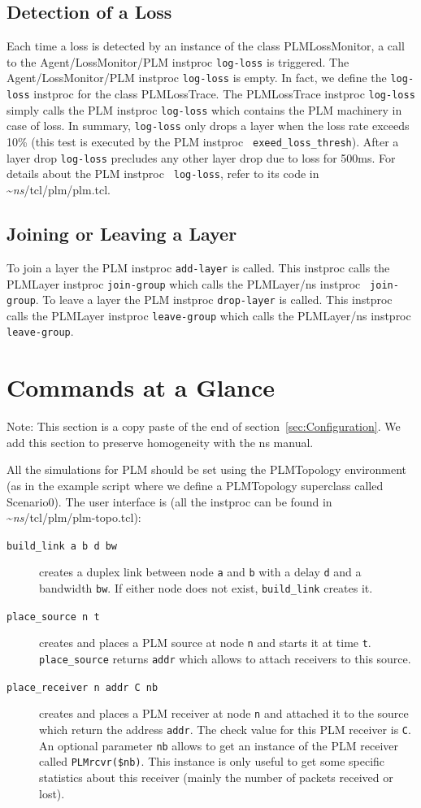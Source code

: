 {\subsection{Detection of a Loss}
Each time a loss is detected by an instance of the class PLMLossMonitor, a call to
the Agent/LossMonitor/PLM instproc {\tt log-loss} is triggered. The
Agent/LossMonitor/PLM instproc {\tt log-loss} 
is empty. In fact, we define the {\tt log-loss} instproc for the class
PLMLossTrace. The PLMLossTrace instproc {\tt log-loss} simply
calls the PLM instproc {\tt log-loss} which contains the PLM machinery in case
of loss. In summary, {\tt log-loss} only drops a layer when the loss rate
exceeds 10\% (this test is executed by the PLM instproc {\tt
  exeed\_loss\_thresh}). After a layer drop {\tt log-loss} precludes any
other layer drop due to loss for 500ms. For details about the PLM instproc {\tt
  log-loss}, refer to its code in \textasciitilde\emph{ns}/{tcl/plm/plm.tcl}. 

\subsection{Joining or Leaving a Layer}
To join a layer the PLM instproc {\tt add-layer} is called. This instproc
calls the PLMLayer instproc {\tt join-group} which calls the PLMLayer/ns instproc {\tt
  join-group}.
To leave a layer the PLM instproc {\tt drop-layer} is called. This instproc
calls the PLMLayer instproc {\tt leave-group} which calls the PLMLayer/ns instproc {\tt
  leave-group}.

\section{Commands at a Glance}
Note: This section is a copy paste of the end of
section~\ref{sec:Configuration}. We add this section to preserve homogeneity with
the ns manual.

All the simulations for PLM should be set using the PLMTopology environment (as
in the example script where we define a PLMTopology superclass called Scenario0). The
user interface is (all the instproc can be found in \textasciitilde\emph{ns}/{tcl/plm/plm-topo.tcl}):
\begin{description}
\item[\tt build\_link a b d bw] creates a duplex link between node
  {\tt a} and {\tt b} with a delay {\tt d} and a bandwidth {\tt bw}. If
  either node does not exist, {\tt build\_link} creates it.
\item[\tt place\_source n t] creates and places a PLM source at node {\tt n} and
  starts it at time {\tt t}. {\tt place\_source} returns {\tt addr} which
  allows to attach receivers to this source.
\item[\tt place\_receiver n addr C nb] creates and places a PLM receiver at node
  {\tt n} and attached it to the source which return the address {\tt addr}. The
  check value for this PLM receiver is {\tt C}. An optional parameter {\tt nb}
  allows to get an instance of the PLM receiver called {\tt PLMrcvr(\$nb)}. This
  instance is only useful to get some specific statistics about this receiver
  (mainly the number of packets received or lost). %
\end{description}
}


